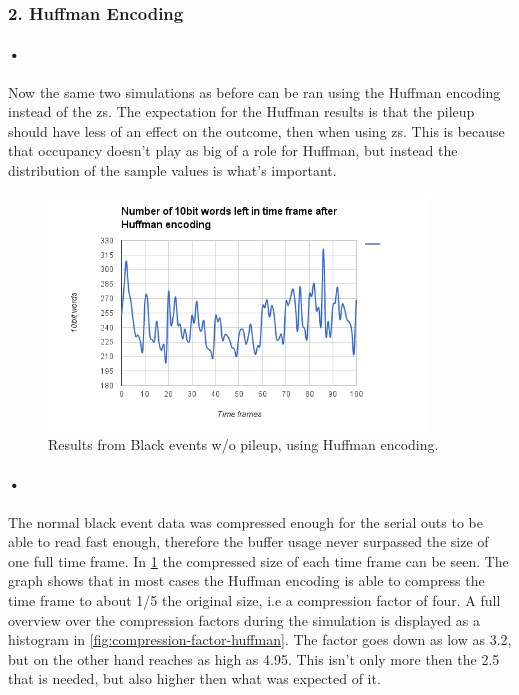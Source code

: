 \documentclass[a4paper, 12pt]{report}
\begin{document}
\subsubsection{2. Huffman Encoding}

\paragraph{•}
Now the same two simulations as before can be ran using the Huffman encoding instead of the \gls{zs}.
The expectation for the Huffman results is that the pileup should have less of an effect on the outcome, then when using \gls{zs}.
This is because that occupancy doesn't play as big of a role for Huffman, but instead the distribution of the sample values is what's important.

\begin{figure}[h!]
	\centering
		\includegraphics[width=0.9\textwidth]{images/blackevents-huffman.png}
		\caption{Results from Black events w/o pileup, using Huffman encoding.}
		\label{fig:blackevents-huffman}
\end{figure}

\paragraph{•}
The normal black event data was compressed enough for the serial outs to be able to read fast enough, therefore the buffer usage never surpassed the size of one full time frame.
In \ref{fig:blackevents-huffman} the compressed size of each time frame can be seen.
The graph shows that in most cases the Huffman encoding is able to compress the time frame to about 1/5 the original size, i.e a compression factor of four.
A full overview over the compression factors during the simulation is displayed as a histogram in \ref{fig:compression-factor-huffman}.
The factor goes down as low as 3.2, but on the other hand reaches as high as 4.95.
This isn't only more then the 2.5 that is needed, but also higher then what was expected of it.
\end{document}
